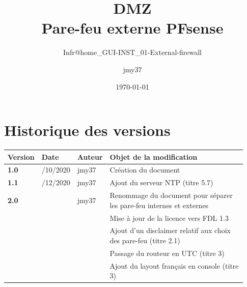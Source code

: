 \documentclass[a4paper, oneside, 12pt, final, headsepline, footsepline]{scrartcl}
\begin{document}
\configHeadersFooters

\title{DMZ \\Pare-feu externe PFsense} %
\subtitle{Infr@home\_GUI-INST\_01-External-firewall}
\author{jmy37}
\date{\today}

\maketitlepage

\section{Historique des versions}
\begin{table}[H]
    \centering
    \begin{tabular}{|>{\centering\arraybackslash}p{0.09\linewidth}|>{\centering\arraybackslash}p{0.12\linewidth}|>{\raggedright\arraybackslash}p{0.12\linewidth}|>{\raggedright\arraybackslash}p{0.6\linewidth}|}
        \hline
        \textbf{Version} & \textbf{Date} & \textbf{Auteur} & \textbf{Objet de la modification}                                              \\ \hline
        \textbf{1.0}     & 20/10/2020    & jmy37           & Création du document                                                           \\ \hline
        \textbf{1.1}     & 09/12/2020    & jmy37           & Ajout du serveur NTP (titre 5.7)                                               \\ \hline
        \textbf{2.0}     &               & jmy37           & Renommage du document pour séparer les pare-feu internes et externes           \\
                         &               &                 & Mise à jour de la licence vers FDL 1.3                                         \\
                         &               &                 & Ajout d'un disclaimer relatif aux choix des pare-feu (titre 2.1)               \\
                         &               &                 & Passage du routeur en UTC (titre 3)                                            \\
                         &               &                 & Ajout du layout français en console (titre 3)                                  \\

\end{tabular}
\end{table}
\end{document}
